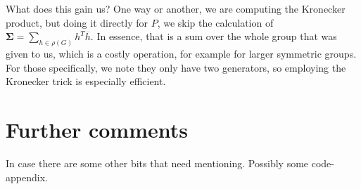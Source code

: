 \documentclass[11pt]{article}
\begin{document}
What does this gain us? One way or another, we are computing the Kronecker product,
but doing it directly for $P$, we skip the calculation of
$\mathbf{\Sigma} = \sum_{h \in \rho(G)} h^T\overline{h}$. In essence, that is a
sum over the whole group that was given to us, which is a costly operation,
for example for larger symmetric groups. For those specifically, we note they only
have two generators, so employing the Kronecker trick is especially efficient.

\section{Further comments}

In case there are some other bits that need mentioning. Possibly some code-appendix.

\newpage

\printbibliography[title={References}]
\end{document}
